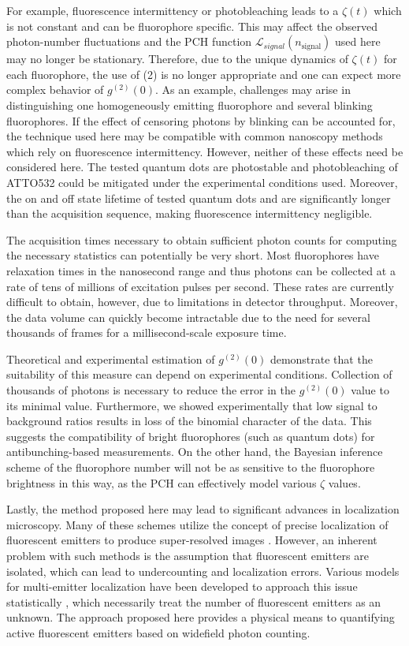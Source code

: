 For example, fluorescence intermittency or photobleaching leads to a $\zeta(t)$ which is not constant and can be fluorophore specific. This may affect the observed photon-number fluctuations and the PCH function $\mathcal{L}_{signal}(n_{\mathrm{signal}})$ used here may no longer be stationary. Therefore, due to the unique dynamics of $\zeta(t)$ for each fluorophore, the use of (2) is no longer appropriate and one can expect more complex behavior of $g^{(2)}(0)$. As an example, challenges may arise in distinguishing one homogeneously emitting fluorophore and several blinking fluorophores. If the effect of censoring photons by blinking can be accounted for, the technique used here may be compatible with common nanoscopy methods which rely on fluorescence intermittency. However, neither of these effects need be considered here. The tested quantum dots are photostable and photobleaching of ATTO532 could be mitigated under the experimental conditions used. Moreover, the on and off state lifetime of tested quantum dots and are significantly longer than the acquisition sequence, making fluorescence intermittency negligible. 
 
The acquisition times necessary to obtain sufficient photon counts for computing the necessary statistics can potentially be very short. Most fluorophores have relaxation times in the nanosecond range and thus photons can be collected at a rate of tens of millions of excitation pulses per second. These rates are currently difficult to obtain, however, due to limitations in detector throughput. Moreover, the data volume can quickly become intractable due to the need for several thousands of frames for a millisecond-scale exposure time. 

Theoretical and experimental estimation of $g^{(2)}(0)$ demonstrate that the suitability of this measure can depend on experimental conditions. Collection of thousands of photons is necessary to reduce the error in the $g^{(2)}(0)$ value to its minimal value. Furthermore, we showed experimentally that low signal to background ratios results in loss of the binomial character of the data. This suggests the compatibility of bright fluorophores (such as quantum dots) for antibunching-based measurements. On the other hand, the Bayesian inference scheme of the fluorophore number will not be as sensitive to the fluorophore brightness in this way, as the PCH can effectively model various $\zeta$ values. 

Lastly, the method proposed here may lead to significant advances in localization microscopy. Many of these schemes utilize the concept of precise localization of fluorescent emitters to produce super-resolved images \parencite{Rust2006,Betzig2006}. However, an inherent problem with such methods is the assumption that fluorescent emitters are isolated, which can lead to undercounting and localization errors. Various models for multi-emitter localization have been developed to approach this issue statistically \parencite{Nehme2020,Speiser2021,Li2019,Fazel2019}, which necessarily treat the number of fluorescent emitters as an unknown. The approach proposed here provides a physical means to quantifying active fluorescent emitters based on widefield photon counting.

